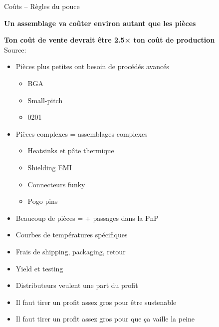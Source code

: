 \begin{frame}{Coûts -- Règles du pouce}
    \begin{twocolumns}[0.55]
        \leftcol
        \centering
        \textbf{Un assemblage va coûter environ autant que les pièces}

        \rightcol
        \centering
        \textbf{Ton coût de vente devrait être 2.5× ton coût de production}\\
        Source: \cite{eevblog-economics}
    \end{twocolumns}

    \begin{twocolumns}[0.555]
        \leftcol
        \begin{itemize}
            \item Pièces plus petites ont besoin de procédés avancés
            \begin{itemize}
                \item BGA
                \item Small-pitch
                \item 0201
            \end{itemize}
            \item Pièces complexes = assemblages complexes
            \begin{itemize}
                \item Heatsinks et pâte thermique
                \item Shielding EMI
                \item Connecteurs funky
                \item Pogo pins
            \end{itemize}
            \item Beaucoup de pièces = + passages dans la PnP
            \item Courbes de températures spécifiques
        \end{itemize}

        \rightcol
        \begin{itemize}
            \item Frais de shipping, packaging, retour
            \item Yield et testing
            \item Distributeurs veulent une part du profit
            \bigskip
            \item Il faut tirer un profit assez gros pour être sustenable
            \item Il faut tirer un profit assez gros pour que ça vaille la peine
        \end{itemize}
    \end{twocolumns}
\end{frame}

